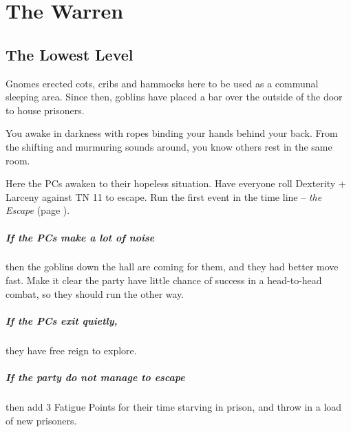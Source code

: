 \chapter{The Warren}



\section{The Lowest Level}

\begin{multicols}{2}
\setcounter{list}{0}


\begin{exampletext}

	Gnomes erected cots, cribs and hammocks here to be used as a communal sleeping area.
	Since then, goblins have placed a bar over the outside of the door to house prisoners.

\end{exampletext}

\begin{boxtext}

	You awake in darkness with ropes binding your hands behind your back.
	From the shifting and murmuring sounds around, you know others rest in the same room.

\end{boxtext}

Here the PCs awaken to their hopeless situation.
Have everyone roll Dexterity + Larceny against TN 11 to escape.
Run the first event in the time line -- \textit{the Escape} (page \pageref{escape}).

\paragraph{If the PCs make a lot of noise}
then the goblins down the hall are coming for them, and they had better move fast.
Make it clear the party have little chance of success in a head-to-head combat, so they should run the other way.

\paragraph{If the PCs exit quietly,}
they have free reign to explore.

\paragraph{If the party do not manage to escape}
then add 3 Fatigue Points for their time starving in prison, and throw in a load of new prisoners.


\end{multicols}
